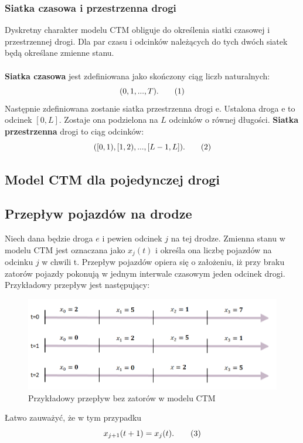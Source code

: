 \documentclass[12pt]{book}
\theoremstyle{plain}
\newcommand\addtag{\refstepcounter{equation}
\renewcommand{\labelenumii}{\theenumii}
\renewcommand{\theenumii}{\theenumi.\arabic{enumii}.}
\tag{\theequation}}
\begin{document}
\subsubsection*{Siatka czasowa i przestrzenna drogi}
Dyskretny charakter modelu CTM obliguje do określenia siatki czasowej i przestrzennej drogi. Dla par czasu i odcinków należących do tych dwóch siatek będą określane zmienne stanu. \\ \\ \textbf{Siatka czasowa} jest zdefiniowana jako skończony ciąg liczb naturalnych:
\[(0,1,...,T). \addtag \]
Następnie zdefiniowana zostanie siatka przestrzenna drogi e. Ustalona droga e to odcinek $[0,L]$. Zostaje ona podzielona na $L$ odcinków o równej długości. \textbf{Siatka przestrzenna} drogi to ciąg odcinków:
\[([0,1),[1,2),...,[L-1,L] ). \addtag \]

\subsection{Model CTM dla pojedynczej drogi}
\subsection*{Przepływ pojazdów na drodze}
Niech dana będzie droga $e$ i pewien odcinek $j$ na tej drodze. Zmienna stanu w modelu CTM jest oznaczana jako $x_j(t)$ i określa ona liczbę pojazdów na odcinku $j$ w chwili t.
Przepływ pojazdów opiera się o założeniu, iż przy braku zatorów pojazdy pokonują w jednym interwale czasowym jeden odcinek drogi. Przykładowy przepływ jest następujący:
\begin{figure}[H]
	\centering
	\includegraphics[width=14cm]{images/CTM_flow_example}
	\caption{Przykładowy przepływ bez zatorów w modelu CTM}
	\label{fig:CTM_flow_example}
\end{figure} \noindent
Łatwo zauważyć, że w tym przypadku
\[ x_{j+1}(t+1)=x_j(t). \addtag \]
\end{document}

